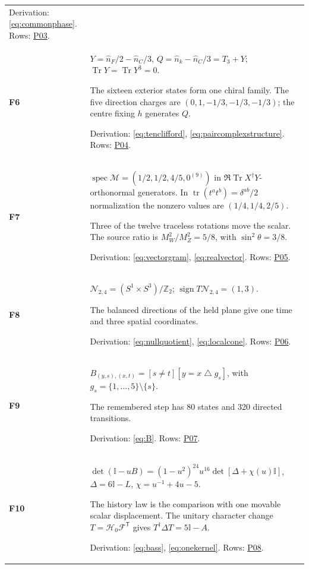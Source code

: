 \documentclass[aps,prx,onecolumn,10pt,notitlepage,nofootinbib,longbibliography]{revtex4-2}
\numberwithin{equation}{section}
\numberwithin{table}{section}
\newcommand{\Id}{\mathbb I}
\newcommand{\Tr}{\operatorname{Tr}}
\newcommand{\tr}{\operatorname{tr}}
\begin{document}
\begin{longtable}{@{}>{\raggedright\arraybackslash}p{}>{\raggedright\arraybackslash}p{}@{}}
Derivation: \eqref{eq:commonphase}. Rows: \hyperlink{row-P03}{P03}.\\[7pt]
\hypertarget{formula-F6}{}\textbf{F6}\label{formula:F6} & $Y=\widehat n_F/2-\widehat n_C/3$, $Q=\widehat n_k-\widehat n_C/3=T_3+Y$; $\Tr Y=\Tr Y^3=0$.\par
The sixteen exterior states form one chiral family. The five direction charges are $(0,1,-1/3,-1/3,-1/3)$; the centre fixing $h$ generates $Q$.\par
Derivation: \eqref{eq:tenclifford}, \eqref{eq:paircomplexstructure}. Rows: \hyperlink{row-P04}{P04}.\\[7pt]
\hypertarget{formula-F7}{}\textbf{F7}\label{formula:F7} & $\operatorname{spec}\mathcal M=(1/2,1/2,4/5,0^{(9)})$ in $\Re\Tr X^\dagger Y$-orthonormal generators. In $\tr(t^at^b)=\delta^{ab}/2$ normalization the nonzero values are $(1/4,1/4,2/5)$.\par
Three of the twelve traceless rotations move the scalar. The source ratio is $M_W^2/M_Z^2=5/8$, with $\sin^2\theta=3/8$.\par
Derivation: \eqref{eq:vectorgram}, \eqref{eq:realvector}. Rows: \hyperlink{row-P05}{P05}.\\[7pt]
\hypertarget{formula-F8}{}\textbf{F8}\label{formula:F8} & $\mathcal N_{2,4}=(S^1\times S^3)/\mathbb Z_2$; $\operatorname{sign}T\mathcal N_{2,4}=(1,3)$.\par
The balanced directions of the held plane give one time and three spatial coordinates.\par
Derivation: \eqref{eq:nullquotient}, \eqref{eq:localcone}. Rows: \hyperlink{row-P06}{P06}.\\[7pt]
\hypertarget{formula-F9}{}\textbf{F9}\label{formula:F9} & $B_{(y,s),(x,t)}=[s\ne t][y=x\mathbin\triangle g_s]$, with $g_s=\{1,\ldots,5\}\setminus\{s\}$.\par
The remembered step has 80 states and 320 directed transitions.\par
Derivation: \eqref{eq:B}. Rows: \hyperlink{row-P07}{P07}.\\[7pt]
\hypertarget{formula-F10}{}\textbf{F10}\label{formula:F10} & $\det(\Id-uB)=(1-u^2)^{24}u^{16}\det[\Delta+\chi(u)\Id]$, $\Delta=6\Id-L$, $\chi=u^{-1}+4u-5$.\par
The history law is the comparison with one movable scalar displacement. The unitary character change $T=\mathscr H_0\mathscr F^{\mathsf T}$ gives $T^\dagger\Delta T=5\Id-A$.\par
Derivation: \eqref{eq:bass}, \eqref{eq:onekernel}. Rows: \hyperlink{row-P08}{P08}.\\[7pt]

\end{longtable}
\end{document}
